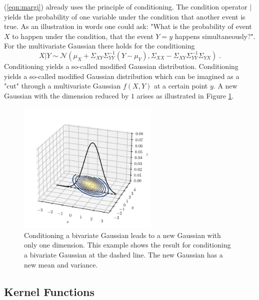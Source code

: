 \documentclass[%
  a4paper,oneside,%
  11pt,%
  smallchapters,
  style=printdev,
  extramargin,
  green,%
  rgb, <cmyk>
  ]{tubsbook}
\begin{document}
(\ref{eqn:margi}) already uses the principle of conditioning. The condition operator $|$ yields the probability of one variable under the condition that another event is true. As an illustration in words one could ask: "What is the probability of event $X$ to happen under the condition, that the event $Y=y$ happens simultaneously?".
For the multivariate Gaussian there holds for the conditioning
\begin{equation}
X|Y \sim \mathcal{N}(\mu_X +\Sigma_{XY} \Sigma_{YY}^{-1}(Y-\mu_Y), \Sigma_{XX} - \Sigma_{XY}\Sigma_{YY}^{-1}\Sigma_{YX} ) \;.
\end{equation}
%
Conditioning yields a so-called modified Gaussian distribution. Conditioning yields a so-called modified Gaussian distribution which can be imagined as a "cut" through a multivariate Gaussian $f(X,Y)$ at a certain point $y$. A new Gaussian with the dimension reduced by $1$ arises as illustrated in Figure \ref{fig:GaussCut3d}.

%
%
\begin{figure}[!ht]
\begin{center}
\includegraphics[width=0.6\textwidth]{pics/Gaussians3dCut}
\caption[Conditioning of a Gaussian]{Conditioning a bivariate Gaussian leads to a new Gaussian with only one dimension. This example shows the result for conditioning a bivariate Gaussian at the dashed line. The new Gaussian has a new mean and variance.}
\label{fig:GaussCut3d}
\end{center}
\end{figure}



\subsection{Kernel Functions}
\label{sec:Kernels}
\end{document}
